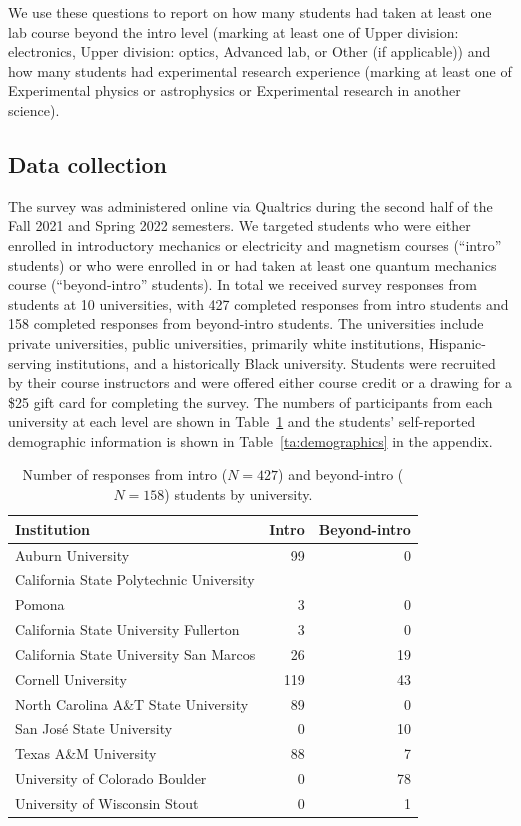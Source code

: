 \documentclass[english,aps,prstper,reprint,showpacs,longbibliography,superscriptaddress,nofootinbib]{revtex4-2}
\begin{document}
We use these questions to report on how many students had taken at least one lab course beyond the intro level (marking at least one of Upper division: electronics, Upper division: optics, Advanced lab, or Other (if applicable)) and how many students had experimental research experience (marking at least one of Experimental physics or astrophysics or Experimental research in another science).

\subsection{Data collection}

The survey was administered online via Qualtrics during the second half of the Fall 2021 and Spring 2022 semesters. We targeted students who were either enrolled in introductory mechanics or electricity and magnetism courses (``intro'' students) or who were enrolled in or had taken at least one quantum mechanics course (``beyond-intro'' students). In total we received survey responses from students at 10 universities, with 427 completed responses from intro students and 158 completed responses from beyond-intro students. The universities include private universities, public universities, primarily white institutions, Hispanic-serving institutions, and a historically Black university. Students were recruited by their course instructors and were offered either course credit or a drawing for a \$25 gift card for completing the survey. The numbers of participants from each university at each level are shown in Table~\ref{ta:universities} and the students' self-reported demographic information is shown in Table~\ref{ta:demographics} in the appendix. 
\begin{table} 
  \caption{Number of responses from intro ($N=427$) and beyond-intro ($N=158$) students by university.}
  \label{ta:universities}
  \begin{ruledtabular}
    \begin{tabular}{lrr}
    Institution & Intro & Beyond-intro\\
    \hline
    Auburn University & 99 & 0\\
    California State Polytechnic University &&\\
    \quad Pomona & 3 & 0\\
    California State University Fullerton & 3 & 0\\
    California State University San Marcos & 26 & 19\\
    Cornell University & 119 & 43\\
    North Carolina A\&T State University & 89 & 0\\
    San Jos\'{e} State University & 0 & 10\\
    Texas A\&M University & 88 & 7\\
    University of Colorado Boulder & 0 & 78\\
    University of Wisconsin Stout & 0 & 1
    \end{tabular}
  \end{ruledtabular}
\end{table}
\end{document}
